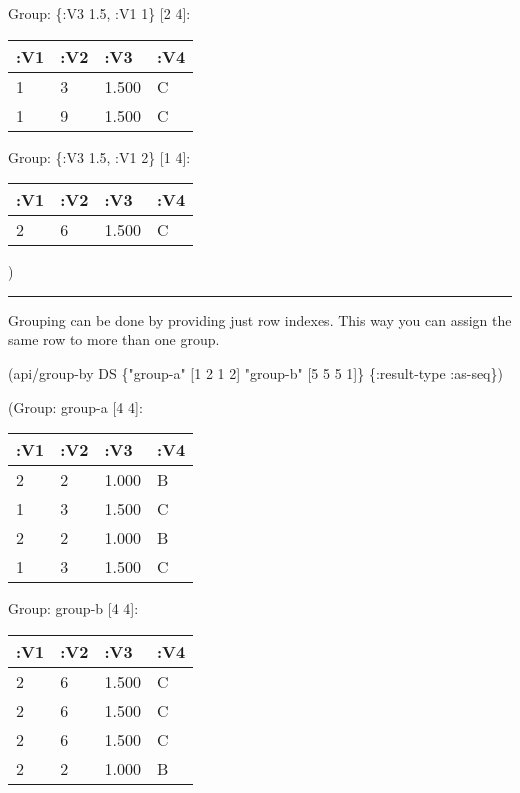 \documentclass[]{article}
\newenvironment{Shaded}{\begin{snugshade}}{\end{snugshade}}
\newcommand{\DecValTok}[1]{\textcolor[rgb]{0.00,0.00,0.81}{#1}}
\newcommand{\StringTok}[1]{\textcolor[rgb]{0.31,0.60,0.02}{#1}}
\newcommand{\AttributeTok}[1]{\textcolor[rgb]{0.77,0.63,0.00}{#1}}
\newcommand{\NormalTok}[1]{#1}
\begin{document}
Group: \{:V3 1.5, :V1 1\} {[}2 4{]}:

\begin{longtable}[]{@{}llll@{}}
\toprule
:V1 & :V2 & :V3 & :V4\tabularnewline
\midrule
\endhead
1 & 3 & 1.500 & C\tabularnewline
1 & 9 & 1.500 & C\tabularnewline
\bottomrule
\end{longtable}

Group: \{:V3 1.5, :V1 2\} {[}1 4{]}:

\begin{longtable}[]{@{}llll@{}}
\toprule
:V1 & :V2 & :V3 & :V4\tabularnewline
\midrule
\endhead
2 & 6 & 1.500 & C\tabularnewline
\bottomrule
\end{longtable}

)

\begin{center}\rule{0.5\linewidth}{0.5pt}\end{center}

Grouping can be done by providing just row indexes. This way you can
assign the same row to more than one group.

\begin{Shaded}
\begin{Highlighting}[]
\NormalTok{(api/group-by DS \{}\StringTok{"group-a"}\NormalTok{ [}\DecValTok{1} \DecValTok{2} \DecValTok{1} \DecValTok{2}\NormalTok{]}
                  \StringTok{"group-b"}\NormalTok{ [}\DecValTok{5} \DecValTok{5} \DecValTok{5} \DecValTok{1}\NormalTok{]\} \{}\AttributeTok{:result-type} \AttributeTok{:as-seq}\NormalTok{\})}
\end{Highlighting}
\end{Shaded}

(Group: group-a {[}4 4{]}:

\begin{longtable}[]{@{}llll@{}}
\toprule
:V1 & :V2 & :V3 & :V4\tabularnewline
\midrule
\endhead
2 & 2 & 1.000 & B\tabularnewline
1 & 3 & 1.500 & C\tabularnewline
2 & 2 & 1.000 & B\tabularnewline
1 & 3 & 1.500 & C\tabularnewline
\bottomrule
\end{longtable}

Group: group-b {[}4 4{]}:

\begin{longtable}[]{@{}llll@{}}
\toprule
:V1 & :V2 & :V3 & :V4\tabularnewline
\midrule
\endhead
2 & 6 & 1.500 & C\tabularnewline
2 & 6 & 1.500 & C\tabularnewline
2 & 6 & 1.500 & C\tabularnewline
2 & 2 & 1.000 & B\tabularnewline
\bottomrule
\end{longtable}
\end{document}
